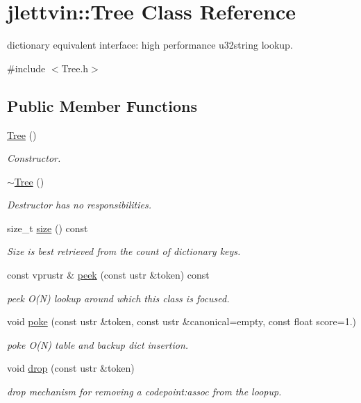 \hypertarget{classjlettvin_1_1_tree}{}\section{jlettvin\+:\+:Tree Class Reference}
\label{classjlettvin_1_1_tree}


dictionary equivalent interface\+: high performance u32string lookup.  




{\ttfamily \#include $<$Tree.\+h$>$}

\subsection*{Public Member Functions}
\begin{DoxyCompactItemize}
\item 
\hyperlink{classjlettvin_1_1_tree_ad376a7c639d857312f5de2ef47482f68}{Tree} ()
\begin{DoxyCompactList}\small\item\em Constructor. \end{DoxyCompactList}\item 
\hyperlink{classjlettvin_1_1_tree_abdc38545cf3f588725b5d8b8075b3866}{$\sim$\+Tree} ()
\begin{DoxyCompactList}\small\item\em Destructor has no responsibilities. \end{DoxyCompactList}\item 
size\+\_\+t \hyperlink{classjlettvin_1_1_tree_a1edf6251d8a3aa6a3a40d261339b83c6}{size} () const 
\begin{DoxyCompactList}\small\item\em Size is best retrieved from the count of dictionary keys. \end{DoxyCompactList}\item 
const vprustr \& \hyperlink{classjlettvin_1_1_tree_a65746e86398aa8215481ffafdd8fa02d}{peek} (const ustr \&token) const 
\begin{DoxyCompactList}\small\item\em peek O(\+N) lookup around which this class is focused. \end{DoxyCompactList}\item 
void \hyperlink{classjlettvin_1_1_tree_a3ffabbc1a6b81df085827f3ed851f061}{poke} (const ustr \&token, const ustr \&canonical=empty, const float score=1.)
\begin{DoxyCompactList}\small\item\em poke O(\+N) table and backup dict insertion. \end{DoxyCompactList}\item 
void \hyperlink{classjlettvin_1_1_tree_af6eacfd1dc52c39d9363857ea9aa6ac9}{drop} (const ustr \&token)
\begin{DoxyCompactList}\small\item\em drop mechanism for removing a codepoint\+:assoc from the loopup. \end{DoxyCompactList}\end{DoxyCompactItemize}


